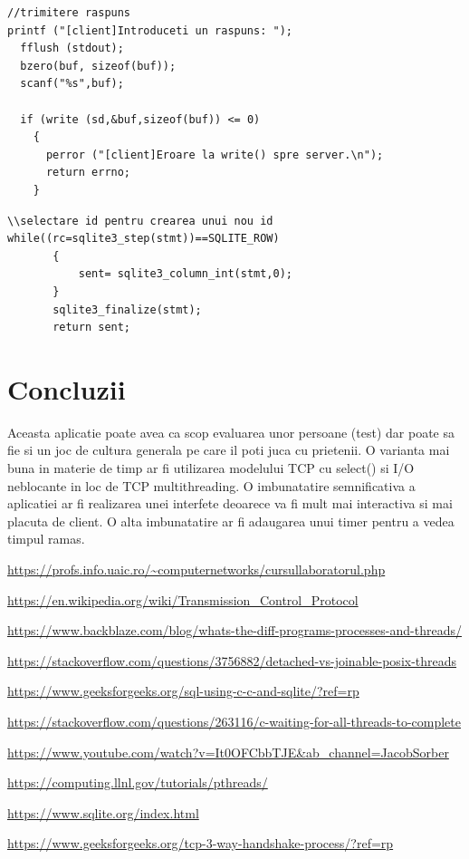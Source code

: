 \documentclass[12]{article}
\begin{document}
\State
\begin{lstlisting}[]
//trimitere raspuns
printf ("[client]Introduceti un raspuns: "); 
  fflush (stdout);
  bzero(buf, sizeof(buf));
  scanf("%s",buf);
 
  if (write (sd,&buf,sizeof(buf)) <= 0)
    {
      perror ("[client]Eroare la write() spre server.\n");
      return errno;
    }

\end{lstlisting}
\State
\begin{lstlisting}[]
\\selectare id pentru crearea unui nou id
while((rc=sqlite3_step(stmt))==SQLITE_ROW)
       {
           sent= sqlite3_column_int(stmt,0);
       }
       sqlite3_finalize(stmt);
       return sent;
\end{lstlisting}

\section{Concluzii}
\hspace{5mm}Aceasta aplicatie poate avea ca scop evaluarea unor persoane (test) dar poate sa fie si un joc de cultura generala pe care il poti juca cu prietenii.
\State \hspace{5mm} O varianta mai buna in materie  de timp ar fi utilizarea modelului TCP cu select() si I/O neblocante in loc de TCP multithreading. 
\State \hspace{5mm}O imbunatatire semnificativa a aplicatiei ar fi realizarea unei interfete deoarece va fi mult mai interactiva si mai placuta de client. O alta imbunatatire ar fi adaugarea unui timer pentru a vedea timpul ramas. 


\begin{thebibliography}{9}

\bibitem{}
  \url{https://profs.info.uaic.ro/~computernetworks/cursullaboratorul.php}
  
 \bibitem{}
 \url{https://en.wikipedia.org/wiki/Transmission\_Control\_Protocol}
 
  \bibitem{}
 \url{https://www.backblaze.com/blog/whats-the-diff-programs-processes-and-threads/}
 
 \bibitem{}
  \url{https://stackoverflow.com/questions/3756882/detached-vs-joinable-posix-threads}
  
   \bibitem{}
  \url{https://www.geeksforgeeks.org/sql-using-c-c-and-sqlite/?ref=rp}
  
  \bibitem{}
  \url{https://stackoverflow.com/questions/263116/c-waiting-for-all-threads-to-complete}
  
 \bibitem{}
  \url{https://www.youtube.com/watch?v=It0OFCbbTJE&ab\_channel=JacobSorber}
  
  \bibitem{}
  \url{https://computing.llnl.gov/tutorials/pthreads/}
  
  \bibitem{}
  \url{https://www.sqlite.org/index.html}
  
  
 \bibitem{}
  \url{https://www.geeksforgeeks.org/tcp-3-way-handshake-process/?ref=rp}
  
  
  
\end{thebibliography}  
\end{document}
